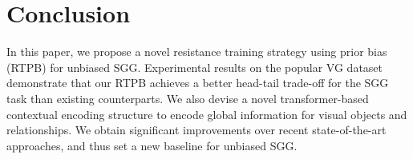 
\section{Conclusion}
In this paper, we propose a novel resistance training strategy using prior bias (RTPB) for unbiased SGG.
Experimental results on the popular VG dataset demonstrate that our RTPB achieves a better head-tail trade-off for the SGG task than existing counterparts. We also devise a novel transformer-based contextual encoding structure to encode global information for visual objects and relationships. We obtain significant improvements over recent state-of-the-art approaches, and thus set a new baseline for unbiased SGG.